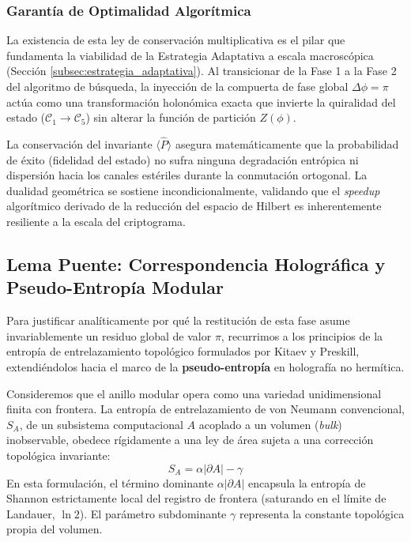 \documentclass[12pt,a4paper]{article}
\theoremstyle{plain}
\theoremstyle{definition}
\theoremstyle{remark}
\begin{document}
\subsubsection*{Garantía de Optimalidad Algorítmica}

La existencia de esta ley de conservación multiplicativa es el pilar que fundamenta la viabilidad de la Estrategia Adaptativa a escala macroscópica (Sección \ref{subsec:estrategia_adaptativa}). Al transicionar de la Fase 1 a la Fase 2 del algoritmo de búsqueda, la inyección de la compuerta de fase global $\Delta\phi = \pi$ actúa como una transformación holonómica exacta que invierte la quiralidad del estado ($\mathcal{C}_1 \to \mathcal{C}_5$) sin alterar la función de partición $Z(\phi)$. 

La conservación del invariante $\langle \hat{P} \rangle$ asegura matemáticamente que la probabilidad de éxito (fidelidad del estado) no sufra ninguna degradación entrópica ni dispersión hacia los canales estériles durante la conmutación ortogonal. La dualidad geométrica se sostiene incondicionalmente, validando que el \textit{speedup} algorítmico derivado de la reducción del espacio de Hilbert es inherentemente resiliente a la escala del criptograma.

\subsection{Lema Puente: Correspondencia Holográfica y Pseudo-Entropía Modular}
\label{subsec:lema_puente}

Para justificar analíticamente por qué la restitución de esta fase asume invariablemente un residuo global de valor $\pi$, recurrimos a los principios de la entropía de entrelazamiento topológico formulados por Kitaev y Preskill, extendiéndolos hacia el marco de la \textbf{pseudo-entropía} en holografía no hermítica.

Consideremos que el anillo modular opera como una variedad unidimensional finita con frontera. La entropía de entrelazamiento de von Neumann convencional, $S_A$, de un subsistema computacional $A$ acoplado a un volumen (\textit{bulk}) inobservable, obedece rígidamente a una ley de área sujeta a una corrección topológica invariante:
\begin{equation}
    S_A = \alpha |\partial A| - \gamma
\end{equation}
En esta formulación, el término dominante $\alpha |\partial A|$ encapsula la entropía de Shannon estrictamente local del registro de frontera (saturando en el límite de Landauer, $\ln 2$). El parámetro subdominante $\gamma$ representa la constante topológica propia del volumen.
\end{document}

